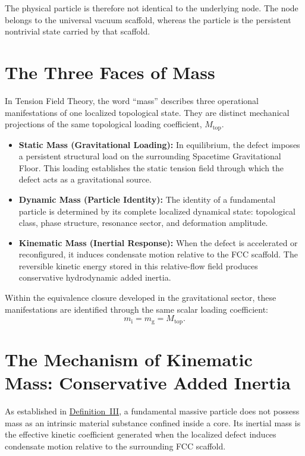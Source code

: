 The physical particle is therefore not identical to the underlying node. The node belongs to the universal vacuum scaffold, whereas the particle is the persistent nontrivial state carried by that scaffold.

\section{The Three Faces of Mass}

In Tension Field Theory, the word ``mass'' describes three operational manifestations of one localized topological state. They are distinct mechanical projections of the same topological loading coefficient, $M_{\mathrm{top}}$.
\begin{itemize}
    \item \textbf{Static Mass (Gravitational Loading):} In equilibrium, the defect imposes a persistent structural load on the surrounding Spacetime Gravitational Floor. This loading establishes the static tension field through which the defect acts as a gravitational source.
    \item \textbf{Dynamic Mass (Particle Identity):} The identity of a fundamental particle is determined by its complete localized dynamical state: topological class, phase structure, resonance sector, and deformation amplitude.
    \item \textbf{Kinematic Mass (Inertial Response):} When the defect is accelerated or reconfigured, it induces condensate motion relative to the FCC scaffold. The reversible kinetic energy stored in this relative-flow field produces conservative hydrodynamic added inertia.
\end{itemize}

Within the equivalence closure developed in the gravitational sector, these manifestations are identified through the same scalar loading coefficient:
\begin{equation}
    m_{\mathrm{i}} = m_{\mathrm{g}} = M_{\mathrm{top}}.
\end{equation}

\section{The Mechanism of Kinematic Mass: Conservative Added Inertia}

As established in \hyperref[def:definition_three]{Definition~III}, a fundamental massive particle does not possess mass as an intrinsic material substance confined inside a core. Its inertial mass is the effective kinetic coefficient generated when the localized defect induces condensate motion relative to the surrounding FCC scaffold.

